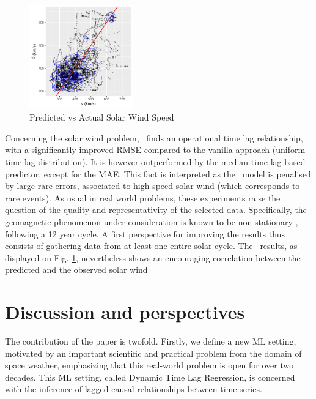 \begin{figure}
  \centering
  \includegraphics[width=0.4\textwidth]{figures/test_scatter_v}
  \caption{Predicted vs Actual Solar Wind Speed} 
  \label{fig:sw_preds}
\end{figure}

Concerning the solar wind problem, \XX\ finds an operational time lag relationship, with a 
significantly improved RMSE compared to the vanilla approach (uniform time lag distribution). 
It is however outperformed by the median time lag based predictor, except for the MAE. This fact 
is interpreted as the \XX\ model is penalised by large rare errors, associated to high speed solar 
wind (which corresponds to rare events). As usual in real world problems, these experiments raise 
the question of the quality and representativity of the selected data. Specifically, the 
geomagnetic phenomenon under consideration is known to be non-stationary 
\citep{nonstationarysolarwind}, following a 12 year cycle. A first perspective for improving the 
results thus consists of gathering data from at least one entire solar cycle. 
The \XX\ results, as displayed on Fig. \ref{fig:sw_preds}, nevertheless shows an encouraging 
correlation between the predicted and the observed solar wind


\section{Discussion and perspectives}
The contribution of the paper is twofold. Firstly, we define a new ML setting, motivated by an 
important scientific and practical problem from the domain of space weather, emphasizing that this 
real-world problem is open for over two decades. This ML setting, called 
Dynamic Time Lag Regression, is concerned with the inference of lagged causal relationships between 
time series. 

